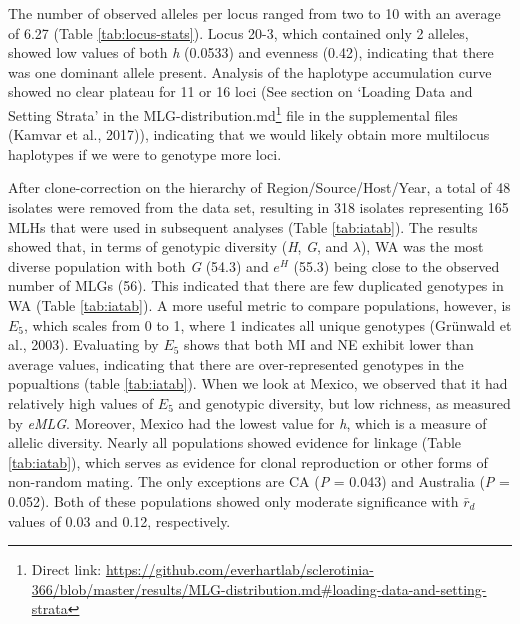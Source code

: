 \documentclass[fleqn,10pt,lineno]{wlpeerj} %
\theoremstyle{definition}
\theoremstyle{definition}
\theoremstyle{definition}
\theoremstyle{remark}
\begin{document}
The number of observed alleles per locus ranged from two to 10 with an
average of 6.27 (Table \ref{tab:locus-stats}). Locus 20-3, which
contained only 2 alleles, showed low values of both \emph{h} (0.0533)
and evenness (0.42), indicating that there was one dominant allele
present. Analysis of the haplotype accumulation curve showed no clear
plateau for 11 or 16 loci (See section on `Loading Data and Setting
Strata' in the MLG-distribution.md\footnote{Direct link:
  \url{https://github.com/everhartlab/sclerotinia-366/blob/master/results/MLG-distribution.md\#loading-data-and-setting-strata}}
file in the supplemental files (Kamvar et al., 2017)), indicating that
we would likely obtain more multilocus haplotypes if we were to genotype
more loci.

After clone-correction on the hierarchy of Region/Source/Host/Year, a
total of 48 isolates were removed from the data set, resulting in 318
isolates representing 165 MLHs that were used in subsequent analyses
(Table \ref{tab:iatab}). The results showed that, in terms of genotypic
diversity (\emph{H}, \emph{G}, and \(\lambda\)), WA was the most diverse
population with both \emph{G} (54.3) and \(e^H\) (55.3) being close to
the observed number of MLGs (56). This indicated that there are few
duplicated genotypes in WA (Table \ref{tab:iatab}). A more useful metric
to compare populations, however, is \(E_5\), which scales from 0 to 1,
where 1 indicates all unique genotypes (Grünwald et al., 2003).
Evaluating by \(E_5\) shows that both MI and NE exhibit lower than
average values, indicating that there are over-represented genotypes in
the popualtions (table \ref{tab:iatab}). When we look at Mexico, we
observed that it had relatively high values of \(E_5\) and genotypic
diversity, but low richness, as measured by \emph{eMLG}. Moreover,
Mexico had the lowest value for \emph{h}, which is a measure of allelic
diversity. Nearly all populations showed evidence for linkage (Table
\ref{tab:iatab}), which serves as evidence for clonal reproduction or
other forms of non-random mating. The only exceptions are CA (\emph{P} =
0.043) and Australia (\emph{P} = 0.052). Both of these populations
showed only moderate significance with \(\bar{r}_d\) values of 0.03 and
0.12, respectively.
\end{document}
